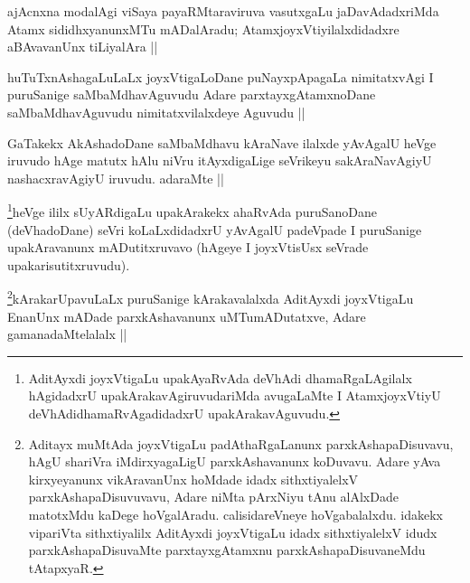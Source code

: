 \begin{artha}
ajAcnxna modalAgi viSaya payaRMtaraviruva vasutxgaLu jaDavAdadxriMda Atamx sididhxyanunxMTu mADalAradu; AtamxjoyxVtiyilalxdidadxre aBAvavanUnx tiLiyalAra ||
\end{artha}

\begin{artha}
huTuTxnAshagaLuLaLx joyxVtigaLoDane puNayxpApagaLa nimitatxvAgi I puruSanige saMbaMdhavAguvudu Adare parxtayxgAtamxnoDane saMbaMdhavAguvudu nimitatxvilalxdeye Aguvudu ||
\end{artha}

\begin{artha}
GaTakekx AkAshadoDane saMbaMdhavu kAraNave ilalxde yAvAgalU heVge iruvudo hAge matutx hAlu niVru itAyxdigaLige seVrikeyu sakAraNavAgiyU nashacxravAgiyU iruvudu. adaraMte ||
\end{artha}

\begin{artha}
\footnote[1]{AditAyxdi joyxVtigaLu upakAyaRvAda deVhAdi dhamaRgaLAgilalx hAgidadxrU upakArakavAgiruvudariMda avugaLaMte I AtamxjoyxVtiyU deVhAdidhamaRvAgadidadxrU upakArakavAguvudu.}heVge ililx sUyARdigaLu upakArakekx ahaRvAda puruSanoDane (deVhadoDane) seVri koLaLxdidadxrU yAvAgalU padeVpade I puruSanige upakAravanunx mADutitxruvavo (hAgeye I joyxVtisUsx seVrade upakarisutitxruvudu).
\end{artha}

\begin{artha}
\footnote[1]{Aditayx muMtAda joyxVtigaLu padAthaRgaLanunx parxkAshapaDisuvavu, hAgU shariVra iMdirxyagaLigU parxkAshavanunx koDuvavu. Adare yAva kirxyeyanunx vikAravanUnx hoMdade idadx sithxtiyalelxV parxkAshapaDisuvuvavu, Adare niMta pArxNiyu tAnu alAlxDade matotxMdu kaDege hoVgalAradu. calisidareVneye hoVgabalalxdu. idakekx vipariVta sithxtiyalilx AditAyxdi joyxVtigaLu idadx sithxtiyalelxV idudx parxkAshapaDisuvaMte parxtayxgAtamxnu parxkAshapaDisuvaneMdu tAtapxyaR.}kArakarUpavuLaLx puruSanige kArakavalalxda AditAyxdi joyxVtigaLu EnanUnx mADade parxkAshavanunx uMTumADutatxve, Adare gamanadaMtelalalx ||
\end{artha}

